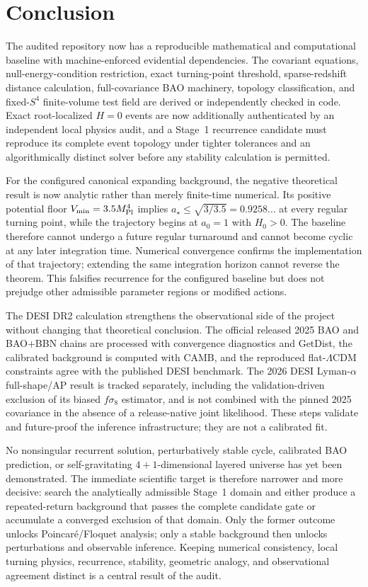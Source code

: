 \section{Conclusion}
The audited \SCPC{} repository now has a reproducible mathematical and computational baseline with machine-enforced evidential dependencies. The covariant equations, null-energy-condition restriction, exact turning-point threshold, sparse-redshift distance calculation, full-covariance BAO machinery, topology classification, and fixed-$S^4$ finite-volume test field are derived or independently checked in code. Exact root-localized $H=0$ events are now additionally authenticated by an independent local physics audit, and a Stage~1 recurrence candidate must reproduce its complete event topology under tighter tolerances and an algorithmically distinct solver before any stability calculation is permitted.

For the configured canonical expanding background, the negative theoretical result is now analytic rather than merely finite-time numerical. Its positive potential floor $V_{\min}=3.5M_{\mathrm{Pl}}^4$ implies $a_\star\le\sqrt{3/3.5}=0.9258\ldots$ at every regular turning point, while the trajectory begins at $a_0=1$ with $H_0>0$. The baseline therefore cannot undergo a future regular turnaround and cannot become cyclic at any later integration time. Numerical convergence confirms the implementation of that trajectory; extending the same integration horizon cannot reverse the theorem. This falsifies recurrence for the configured baseline but does not prejudge other admissible parameter regions or modified actions.

The DESI DR2 calculation strengthens the observational side of the project without changing that theoretical conclusion. The official released 2025 BAO and BAO+BBN chains are processed with convergence diagnostics and GetDist, the calibrated background is computed with CAMB, and the reproduced flat-$\Lambda$CDM constraints agree with the published DESI benchmark. The 2026 DESI Lyman-$\alpha$ full-shape/AP result is tracked separately, including the validation-driven exclusion of its biased $f\sigma_8$ estimator, and is not combined with the pinned 2025 covariance in the absence of a release-native joint likelihood. These steps validate and future-proof the inference infrastructure; they are not a calibrated \SCPC{} fit.

No nonsingular recurrent \SCPC{} solution, perturbatively stable cycle, calibrated \SCPC{} BAO prediction, or self-gravitating $4+1$-dimensional layered universe has yet been demonstrated. The immediate scientific target is therefore narrower and more decisive: search the analytically admissible Stage~1 domain and either produce a repeated-return background that passes the complete candidate gate or accumulate a converged exclusion of that domain. Only the former outcome unlocks Poincar\'e/Floquet analysis; only a stable background then unlocks perturbations and observable inference. Keeping numerical consistency, local turning physics, recurrence, stability, geometric analogy, and observational agreement distinct is a central result of the audit.
